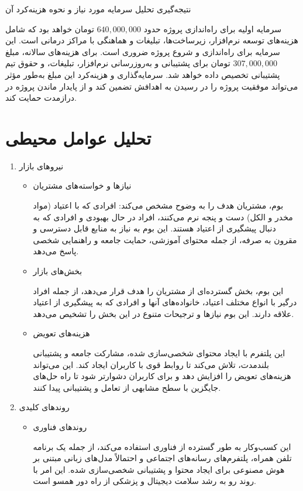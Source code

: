 \documentclass[dvipsnames, svgnames, x11names, 11pt]{article}
\begin{document}
نتیجه‌گیری تحلیل سرمایه مورد نیاز و نحوه هزینه‌کرد آن

سرمایه اولیه برای راه‌اندازی پروژه حدود
$640,000,000$
تومان خواهد بود که شامل هزینه‌های توسعه نرم‌افزار، زیرساخت‌ها، تبلیغات و هماهنگی با مراکز درمانی است. این سرمایه برای راه‌اندازی و شروع پروژه ضروری است.
برای هزینه‌های سالانه، مبلغ
$307,000,000$
تومان برای پشتیبانی و به‌روزرسانی نرم‌افزار، تبلیغات، و حقوق تیم پشتیبانی تخصیص داده خواهد شد.
سرمایه‌گذاری و هزینه‌کرد این مبلغ به‌طور مؤثر می‌تواند موفقیت پروژه را در رسیدن به اهدافش تضمین کند و از پایدار ماندن پروژه در درازمدت حمایت کند.
\section{تحلیل عوامل محیطی}
\begin{enumerate}
\item 
نیروهای بازار 

\begin{itemize}
\item 
نیازها و خواسته‌های مشتریان

بوم، مشتریان هدف را به وضوح مشخص می‌کند: افرادی که با اعتیاد (مواد مخدر و الکل) دست و پنجه نرم می‌کنند، افراد در حال بهبودی و افرادی که به دنبال پیشگیری از اعتیاد هستند. این بوم به نیاز به منابع قابل دسترسی و مقرون به صرفه، از جمله محتوای آموزشی، حمایت جامعه و راهنمایی شخصی پاسخ می‌دهد.

\item
بخش‌های بازار

این بوم، بخش گسترده‌ای از مشتریان را هدف قرار می‌دهد، از جمله افراد درگیر با انواع مختلف اعتیاد، خانواده‌های آنها و افرادی که به پیشگیری از اعتیاد علاقه دارند. این بوم نیازها و ترجیحات متنوع در این بخش را تشخیص می‌دهد.

\item
هزینه‌های تعویض

این پلتفرم با ایجاد محتوای شخصی‌سازی شده، مشارکت جامعه و پشتیبانی بلندمدت، تلاش می‌کند تا روابط قوی با کاربران ایجاد کند. این می‌تواند هزینه‌های تعویض را افزایش دهد و برای کاربران دشوارتر شود تا راه حل‌های جایگزین با سطح مشابهی از تعامل و پشتیبانی پیدا کنند.
\end{itemize}

\item 
روندهای کلیدی 

\begin{itemize}
\item
روندهای فناوری

این کسب‌وکار به طور گسترده از فناوری استفاده می‌کند، از جمله یک برنامه تلفن همراه، پلتفرم‌های رسانه‌های اجتماعی و احتمالاً مدل‌های زبانی مبتنی بر هوش مصنوعی برای ایجاد محتوا و پشتیبانی شخصی‌سازی شده. این امر با روند رو به رشد سلامت دیجیتال و پزشکی از راه دور همسو است.


\end{itemize}
\end{enumerate}
\end{document}
